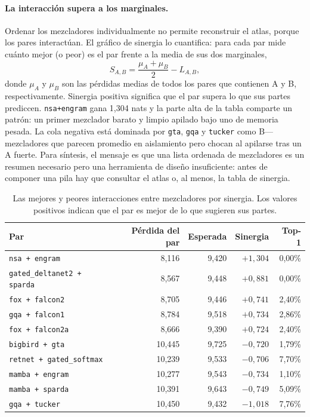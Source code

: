\paragraph{La interacción supera a los marginales.}
Ordenar los mezcladores individualmente no permite reconstruir el atlas, porque los pares interactúan. El gráfico de sinergia lo cuantifica: para cada par mide cuánto mejor (o peor) es el par frente a la media de sus dos marginales,
\[
S_{A,B} = \frac{\mu_A + \mu_B}{2} - L_{A,B},
\]
donde $\mu_A$ y $\mu_B$ son las pérdidas medias de todos los pares que contienen A y B, respectivamente. Sinergia positiva significa que el par supera lo que sus partes prediccen. \texttt{nsa+engram} gana 1,304 nats y la parte alta de la tabla comparte un patrón: un primer mezclador barato y limpio apilado bajo uno de memoria pesada. La cola negativa está dominada por \texttt{gta}, \texttt{gqa} y \texttt{tucker} como B---mezcladores que parecen promedio en aislamiento pero chocan al apilarse tras un A fuerte. Para síntesis, el mensaje es que una lista ordenada de mezcladores es un resumen necesario pero una herramienta de diseño insuficiente: antes de componer una pila hay que consultar el atlas o, al menos, la tabla de sinergia.

\begin{table}[H]
\centering
\small
\caption{Las mejores y peores interacciones entre mezcladores por sinergia. Los valores positivos indican que el par es mejor de lo que sugieren sus partes.}
\label{tab:r2-synergy}
\begin{tabular}{lrrrr}
\toprule
Par & Pérdida del par & Esperada & Sinergia & Top-1 \\
\midrule
\texttt{nsa + engram}              & 8,116  & 9,420 & $+1{,}304$ & 0,00\% \\
\texttt{gated\_deltanet2 + sparda} & 8,567  & 9,448 & $+0{,}881$ & 0,00\% \\
\texttt{fox + falcon2}             & 8,705  & 9,446 & $+0{,}741$ & 2,40\% \\
\texttt{gqa + falcon1}             & 8,784  & 9,518 & $+0{,}734$ & 2,86\% \\
\texttt{fox + falcon2a}            & 8,666  & 9,390 & $+0{,}724$ & 2,40\% \\
\midrule
\texttt{bigbird + gta}             & 10,445 & 9,725 & $-0{,}720$ & 1,79\% \\
\texttt{retnet + gated\_softmax}   & 10,239 & 9,533 & $-0{,}706$ & 7,70\% \\
\texttt{mamba + engram}            & 10,277 & 9,543 & $-0{,}734$ & 1,10\% \\
\texttt{mamba + sparda}            & 10,391 & 9,643 & $-0{,}749$ & 5,09\% \\
\texttt{gqa + tucker}              & 10,450 & 9,432 & $-1{,}018$ & 7,76\% \\
\bottomrule
\end{tabular}
\end{table}

